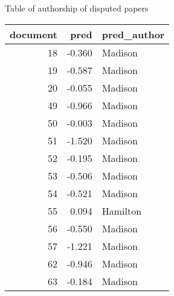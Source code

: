 \documentclass[]{book}
\newenvironment{Shaded}{\begin{snugshade}}{\end{snugshade}}
\newcommand{\KeywordTok}[1]{\textcolor[rgb]{0.13,0.29,0.53}{\textbf{#1}}}
\newcommand{\StringTok}[1]{\textcolor[rgb]{0.31,0.60,0.02}{#1}}
\newcommand{\OperatorTok}[1]{\textcolor[rgb]{0.81,0.36,0.00}{\textbf{#1}}}
\newcommand{\NormalTok}[1]{#1}
\theoremstyle{definition}
\theoremstyle{definition}
\theoremstyle{definition}
\theoremstyle{remark}
\begin{document}
Table of authorship of disputed papers

\begin{Shaded}
\end{Shaded}

\begin{tabular}{r|r|l}
\hline
document & pred & pred\_author\\
\hline
18 & -0.360 & Madison\\
\hline
19 & -0.587 & Madison\\
\hline
20 & -0.055 & Madison\\
\hline
49 & -0.966 & Madison\\
\hline
50 & -0.003 & Madison\\
\hline
51 & -1.520 & Madison\\
\hline
52 & -0.195 & Madison\\
\hline
53 & -0.506 & Madison\\
\hline
54 & -0.521 & Madison\\
\hline
55 & 0.094 & Hamilton\\
\hline
56 & -0.550 & Madison\\
\hline
57 & -1.221 & Madison\\
\hline
62 & -0.946 & Madison\\
\hline
63 & -0.184 & Madison\\
\hline
\end{tabular}
\end{document}
